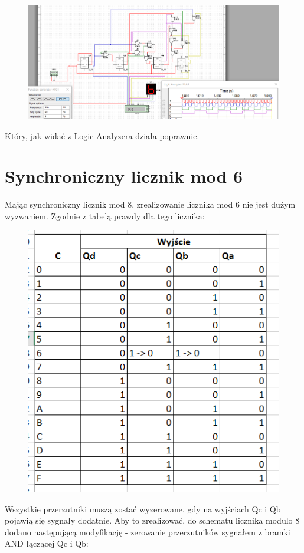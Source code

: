 \documentclass[12pt,a4paper]{article}
\begin{document}
\begin{figure}[H]
\centering
\includegraphics[width=\textwidth]{img/4c_4bit_mod8}
\end{figure} 
Który, jak widać z Logic Analyzera działa poprawnie.
\section{Synchroniczny licznik mod 6}
Mając synchroniczny licznik mod 8, zrealizowanie licznika mod 6 nie jest dużym wyzwaniem. Zgodnie z tabelą prawdy dla tego licznika:

\begin{figure}[H]
\centering
\includegraphics{img/4d_table}
\end{figure}

Wszystkie przerzutniki muszą zostać wyzerowane, gdy na wyjściach Qc i Qb pojawią się sygnały dodatnie. Aby to zrealizować, do schematu licznika modulo 8 dodano następującą modyfikację - zerowanie przerzutników sygnałem z bramki AND łączącej Qc i Qb:
\end{document}

